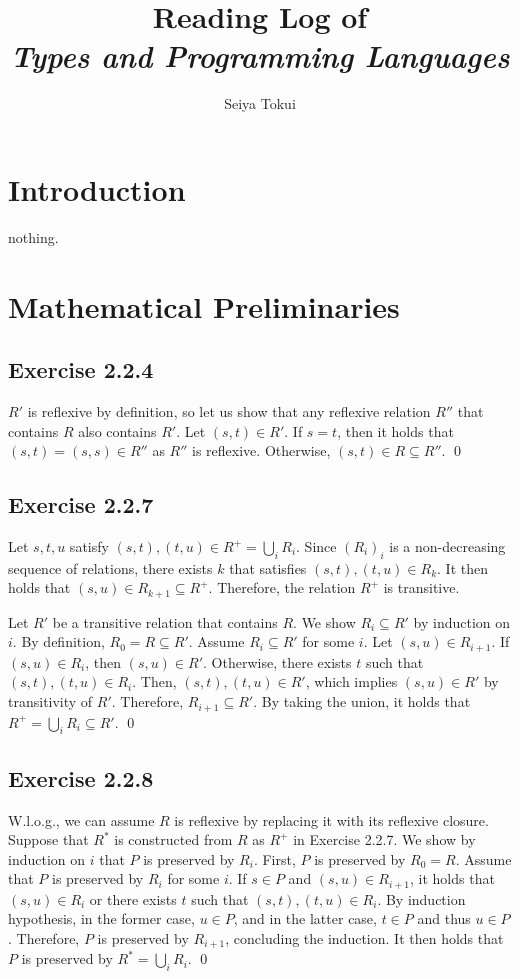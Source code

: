\documentclass{article}
\title{Reading Log of \\ \emph{Types and Programming Languages}}
\author{Seiya Tokui}
\newcommand{\Ex}[1]{\subsection*{Exercise #1}}
\begin{document}
\maketitle

\section{Introduction}

nothing.

\section{Mathematical Preliminaries}

\Ex{2.2.4}

$R'$ is reflexive by definition, so let us show that any reflexive relation $R''$
  that contains $R$ also contains $R'$.
Let $(s, t) \in R'$.
If $s = t$, then it holds that $(s, t) = (s, s) \in R''$ as $R''$ is reflexive.
Otherwise, $(s, t) \in R \subseteq R''$. \qed

\Ex{2.2.7}

Let $s, t, u$ satisfy $(s, t), (t, u) \in R^+ = \bigcup_i R_i$.
Since $(R_i)_i$ is a non-decreasing sequence of relations,
  there exists $k$ that satisfies $(s, t), (t, u) \in R_k$.
It then holds that $(s, u) \in R_{k + 1} \subseteq R^+$.
Therefore, the relation $R^+$ is transitive.

Let $R'$ be a transitive relation that contains $R$.
We show $R_i \subseteq R'$ by induction on $i$.
By definition, $R_0 = R \subseteq R'$.
Assume $R_i \subseteq R'$ for some $i$.
Let $(s, u) \in R_{i + 1}$.
If $(s, u) \in R_i$, then $(s, u) \in R'$.
Otherwise, there exists $t$ such that $(s, t), (t, u) \in R_i$.
Then, $(s, t), (t, u) \in R'$, which implies $(s, u) \in R'$ by transitivity of $R'$.
Therefore, $R_{i + 1} \subseteq R'$.
By taking the union, it holds that $R^+ = \bigcup_i R_i \subseteq R'$. \qed

\Ex{2.2.8}

W.l.o.g., we can assume $R$ is reflexive by replacing it with its reflexive closure.
Suppose that $R^*$ is constructed from $R$ as $R^+$ in Exercise 2.2.7.
We show by induction on $i$ that $P$ is preserved by $R_i$.
First, $P$ is preserved by $R_0 = R$.
Assume that $P$ is preserved by $R_i$ for some $i$.
If $s \in P$ and $(s, u) \in R_{i + 1}$,
  it holds that $(s, u) \in R_i$
  or there exists $t$ such that $(s, t), (t, u) \in R_i$.
By induction hypothesis,
  in the former case, $u \in P$,
  and in the latter case, $t \in P$ and thus $u \in P$.
Therefore, $P$ is preserved by $R_{i + 1}$, concluding the induction.
It then holds that $P$ is preserved by $R^* = \bigcup_i R_i$. \qed
\end{document}
